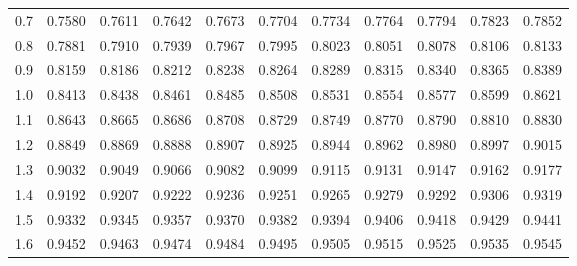 \begin{table}[p]
\begin{center}
{\begin{tabular}{c | rrrrr | rrrrr |}
  0.7 & \scriptsize{0.7580} & \scriptsize{0.7611} & \scriptsize{0.7642} & \scriptsize{0.7673} & \scriptsize{0.7704} & \scriptsize{0.7734} & \scriptsize{0.7764} & \scriptsize{0.7794} & \scriptsize{0.7823} & \scriptsize{0.7852} \\
  0.8 & \scriptsize{0.7881} & \scriptsize{0.7910} & \scriptsize{0.7939} & \scriptsize{0.7967} & \scriptsize{0.7995} & \scriptsize{0.8023} & \scriptsize{0.8051} & \scriptsize{0.8078} & \scriptsize{0.8106} & \scriptsize{0.8133} \\
  0.9 & \scriptsize{0.8159} & \scriptsize{0.8186} & \scriptsize{0.8212} & \scriptsize{0.8238} & \scriptsize{0.8264} & \scriptsize{0.8289} & \scriptsize{0.8315} & \scriptsize{0.8340} & \scriptsize{0.8365} & \scriptsize{0.8389} \\
  \hline
  \hline
  1.0 & \scriptsize{0.8413} & \scriptsize{0.8438} & \scriptsize{0.8461} & \scriptsize{0.8485} & \scriptsize{0.8508} & \scriptsize{0.8531} & \scriptsize{0.8554} & \scriptsize{0.8577} & \scriptsize{0.8599} & \scriptsize{0.8621} \\
  1.1 & \scriptsize{0.8643} & \scriptsize{0.8665} & \scriptsize{0.8686} & \scriptsize{0.8708} & \scriptsize{0.8729} & \scriptsize{0.8749} & \scriptsize{0.8770} & \scriptsize{0.8790} & \scriptsize{0.8810} & \scriptsize{0.8830} \\
  1.2 & \scriptsize{0.8849} & \scriptsize{0.8869} & \scriptsize{0.8888} & \scriptsize{0.8907} & \scriptsize{0.8925} & \scriptsize{0.8944} & \scriptsize{0.8962} & \scriptsize{0.8980} & \scriptsize{0.8997} & \scriptsize{0.9015} \\
  1.3 & \scriptsize{0.9032} & \scriptsize{0.9049} & \scriptsize{0.9066} & \scriptsize{0.9082} & \scriptsize{0.9099} & \scriptsize{0.9115} & \scriptsize{0.9131} & \scriptsize{0.9147} & \scriptsize{0.9162} & \scriptsize{0.9177} \\
  1.4 & \scriptsize{0.9192} & \scriptsize{0.9207} & \scriptsize{0.9222} & \scriptsize{0.9236} & \scriptsize{0.9251} & \scriptsize{0.9265} & \scriptsize{0.9279} & \scriptsize{0.9292} & \scriptsize{0.9306} & \scriptsize{0.9319} \\
  \hline
  1.5 & \scriptsize{0.9332} & \scriptsize{0.9345} & \scriptsize{0.9357} & \scriptsize{0.9370} & \scriptsize{0.9382} & \scriptsize{0.9394} & \scriptsize{0.9406} & \scriptsize{0.9418} & \scriptsize{0.9429} & \scriptsize{0.9441} \\
  1.6 & \scriptsize{0.9452} & \scriptsize{0.9463} & \scriptsize{0.9474} & \scriptsize{0.9484} & \scriptsize{0.9495} & \scriptsize{0.9505} & \scriptsize{0.9515} & \scriptsize{0.9525} & \scriptsize{0.9535} & \scriptsize{0.9545} \\

\end{tabular}}
\end{center}
\end{table}
